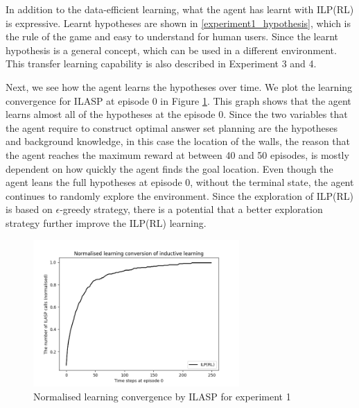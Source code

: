 

% 

In addition to the data-efficient learning, what the agent has learnt with ILP(RL) is expressive.
Learnt hypotheses are shown in \ref{experiment1_hypothesis}, which is the rule of the game and easy to understand for human users.
Since the learnt hypothesis is a general concept, which can be used in a different environment.
This transfer learning capability is also described in Experiment 3 and 4.

Next, we see how the agent learns the hypotheses over time. We plot the learning convergence for ILASP at episode 0 in Figure \ref{experiment1_ilasp}.
This graph shows that the agent learns almost all of the hypotheses at the episode 0.
Since the two variables that the agent require to construct optimal answer set planning are the hypotheses and background knowledge, in this case the location of the walls, 
the reason that the agent reaches the maximum reward at between 40 and 50 episodes, is mostly dependent on how quickly the agent finds the goal location.
Even though the agent leans the full hypotheses at episode 0, without the terminal state, the agent continues to randomly explore the environment.
Since the exploration of ILP(RL) is based on $\epsilon$-greedy strategy, there is a potential that a better exploration strategy further improve the ILP(RL) learning.

\begin{figure}[!htb]
\centering
\includegraphics[width=0.7\textwidth]{./figures/experiment1_ilasp}
\caption{Normalised learning convergence by ILASP for experiment 1}
\label{experiment1_ilasp}
\end{figure}


